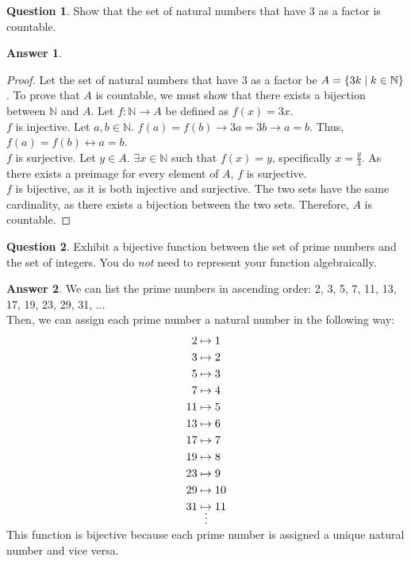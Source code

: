 \documentclass[article, 12pt]{article}
\theoremstyle{definition}
\newtheorem{question}{Question}
\newtheorem{answer}{Answer}
\DeclarePairedDelimiter\set{\{}{\}}
\newcommand{\nats}{\mathbb{N}}
\begin{document}
    \begin{question}
        Show that the set of natural numbers that have 3 as a factor is countable.
    \end{question}
    
    \begin{answer} \
        \begin{proof}
            Let the set of natural numbers that have 3 as a factor be $A = \set*{3k \mid k \in \nats}$. To prove that $A$ is countable, we must show that there exists a bijection between $\nats$ and $A$. Let $f: \nats \to A$ be defined as $f(x) = 3x$. 
            \\[12pt]
            $f$ is injective. Let $a,b \in \nats$. $f(a) = f(b) \to 3a = 3b \to a = b$. Thus, $f(a) = f(b) \leftrightarrow a = b$.
            \\[12pt]
            $f$ is surjective. Let $y \in A$. $\exists x \in \nats$ such that $f(x) = y$, specifically $x = \displaystyle\frac{y}{3}$. As there exists a preimage for every element of $A$, $f$ is surjective.
            \\[12pt]
            $f$ is bijective, as it is both injective and surjective. The two sets have the same cardinality, as there exists a bijection between the two sets. Therefore, $A$ is countable.
        \end{proof}
    \end{answer}

    \begin{question}
        Exhibit a bijective function between the set of prime numbers and the set of integers. You do \textit{not} need to represent your function algebraically.
    \end{question}

    \begin{answer}
        We can list the prime numbers in ascending order: 2, 3, 5, 7, 11, 13, 17, 19, 23, 29, 31, $\dots$
        \\[12pt]
        Then, we can assign each prime number a natural number in the following way:
        \begin{align*}
            2 & \mapsto 1 \\
            3 & \mapsto 2 \\
            5 & \mapsto 3 \\
            7 & \mapsto 4 \\
            11 & \mapsto 5 \\
            13 & \mapsto 6 \\
            17 & \mapsto 7 \\
            19 & \mapsto 8 \\
            23 & \mapsto 9 \\
            29 & \mapsto 10 \\
            31 & \mapsto 11 \\
               &\shortvdotswithin{\mapsto}
        \end{align*}
        This function is bijective because each prime number is assigned a unique natural number and vice versa. 
    \end{answer}
\end{document}
